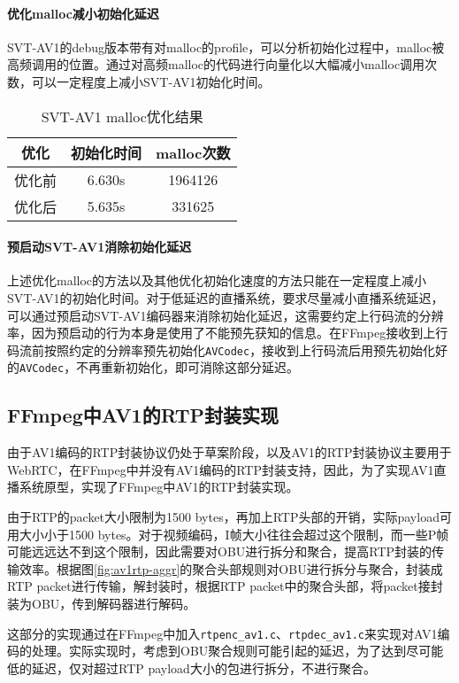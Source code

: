   \paragraph{优化malloc减小初始化延迟} SVT-AV1的debug版本带有对malloc的profile，可以分析初始化过程中，malloc被高频调用的位置。通过对高频malloc的代码进行向量化以大幅减小malloc调用次数，可以一定程度上减小SVT-AV1初始化时间。

  \begin{table}[!hpt]
    \caption{SVT-AV1 malloc优化结果}
    \label{tab:malloc}
    \centering
    \begin{tabular}{ccc} \toprule
      优化    & 初始化时间 & malloc次数\\ \midrule
      优化前  & 6.630s   & 1964126  \\
      优化后  & 5.635s   & 331625   \\ \bottomrule
    \end{tabular}
  \end{table}

  \paragraph{预启动SVT-AV1消除初始化延迟} 上述优化malloc的方法以及其他优化初始化速度的方法只能在一定程度上减小SVT-AV1的初始化时间。对于低延迟的直播系统，要求尽量减小直播系统延迟，可以通过预启动SVT-AV1编码器来消除初始化延迟，这需要约定上行码流的分辨率，因为预启动的行为本身是使用了不能预先获知的信息。在FFmpeg接收到上行码流前按照约定的分辨率预先初始化\texttt{AVCodec}，接收到上行码流后用预先初始化好的\texttt{AVCodec}，不再重新初始化，即可消除这部分延迟。

\subsection{FFmpeg中AV1的RTP封装实现}
  由于AV1编码的RTP封装协议\cite{RTPPayloadFormat}仍处于草案阶段，以及AV1的RTP封装协议主要用于WebRTC，在FFmpeg中并没有AV1编码的RTP封装支持，因此，为了实现AV1直播系统原型，实现了FFmpeg中AV1的RTP封装实现。

  由于RTP的packet大小限制为1500 bytes，再加上RTP头部的开销，实际payload可用大小小于1500 bytes。对于视频编码，I帧大小往往会超过这个限制，而一些P帧可能远远达不到这个限制，因此需要对OBU进行拆分和聚合，提高RTP封装的传输效率。根据图\ref{fig:av1rtp-aggr}的聚合头部规则对OBU进行拆分与聚合，封装成RTP packet进行传输，解封装时，根据RTP packet中的聚合头部，将packet接封装为OBU，传到解码器进行解码。

  这部分的实现通过在FFmpeg中加入\texttt{rtpenc\_av1.c}、\texttt{rtpdec\_av1.c}来实现对AV1编码的处理。实际实现时，考虑到OBU聚合规则可能引起的延迟，为了达到尽可能低的延迟，仅对超过RTP payload大小的包进行拆分，不进行聚合。

